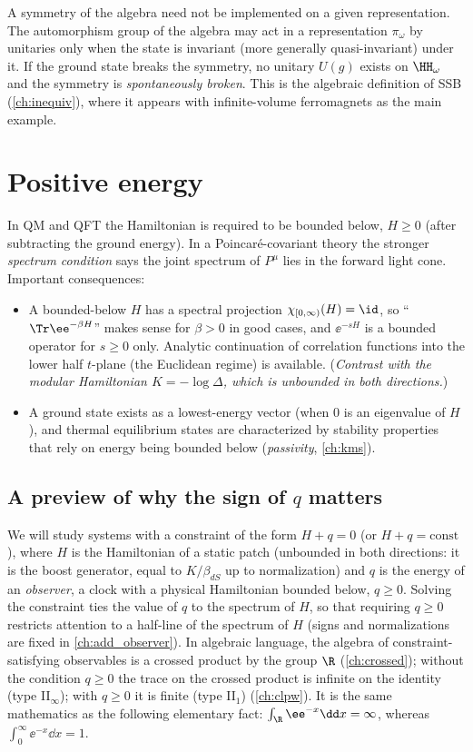 \begin{whatwrong}
A symmetry of the algebra need not be implemented on a given representation. The automorphism group of the algebra may act in a representation $\pi_\omega$ by unitaries only when the state is invariant (more generally quasi-invariant) under it. If the ground state breaks the symmetry, no unitary $U(g)$ exists on $\HH_\omega$ and the symmetry is \emph{spontaneously broken}. This is the algebraic definition of SSB (\cref{ch:inequiv}), where it appears with infinite-volume ferromagnets as the main example.
\end{whatwrong}

\section{Positive energy}

In QM and QFT the Hamiltonian is required to be bounded below, $H\ge0$ (after subtracting the ground energy). In a Poincar\'e-covariant theory the stronger \emph{spectrum condition} says the joint spectrum of $P^\mu$ lies in the forward light cone. Important consequences:
\begin{itemize}
\item A bounded-below $H$ has a spectral projection $\chi_{[0,\infty)}(H)=\id$, so ``$\Tr\ee^{-\beta H}$'' makes sense for $\beta>0$ in good cases, and $\ee^{-sH}$ is a bounded operator for $s\ge0$ only. Analytic continuation of correlation functions into the lower half $t$-plane (the Euclidean regime) is available. (\emph{Contrast with the modular Hamiltonian $K=-\log\Delta$, which is \emph{unbounded in both directions}.})
\item A ground state exists as a lowest-energy vector (when $0$ is an eigenvalue of $H$), and thermal equilibrium states are characterized by stability properties that rely on energy being bounded below (\emph{passivity}, \cref{ch:kms}).
\end{itemize}

\subsection*{A preview of why the sign of $q$ matters}
We will study systems with a constraint of the form $H+q=0$ (or $H+q=\text{const}$), where $H$ is the Hamiltonian of a static patch (unbounded in both directions: it is the boost generator, equal to $K/\beta_{dS}$ up to normalization) and $q$ is the energy of an \emph{observer}, a clock with a physical Hamiltonian bounded below, $q\ge0$. Solving the constraint ties the value of $q$ to the spectrum of $H$, so that requiring $q\ge0$ restricts attention to a half-line of the spectrum of $H$ (signs and normalizations are fixed in \cref{ch:add_observer}). In algebraic language, the algebra of constraint-satisfying observables is a crossed product by the group $\R$ (\cref{ch:crossed}); without the condition $q\ge0$ the trace on the crossed product is infinite on the identity (type II$_\infty$); with $q\ge0$ it is finite (type II$_1$) (\cref{ch:clpw}). It is the same mathematics as the following elementary fact: $\int_{\R}\ee^{-x}\dd x=\infty$, whereas $\int_0^\infty\ee^{-x}\dd x=1$.

